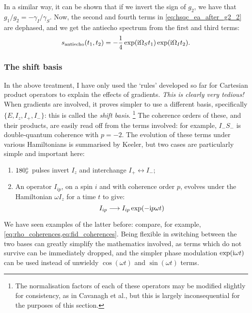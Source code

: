 In a similar way, it can be shown that if we invert the sign of $g_2$, we have that $g_1/g_2 = -\gamma_I/\gamma_S$.
Now, the second and fourth terms in \cref{eq:hsqc_ea_after_g2_2} are dephased, and we get the antiecho spectrum from the first and third terms:
\begin{equation}
    \label{eq:hsqc_ea_antiecho_signal}
    s_\text{antiecho}(t_1, t_2) = -\frac{1}{4}\exp(\mathrm{i} \Omega_S t_1)\exp(\mathrm{i} \Omega_I t_2).
\end{equation}


\subsubsection{The shift basis}

In the above treatment, I have only used the `rules' developed so far for Cartesian product operators to explain the effects of gradients.
\textit{This is clearly very tedious!}
When gradients are involved, it proves simpler to use a different basis, specifically $\{E, I_z, I_+, I_-\}$: this is called the \textit{shift basis}.%
\footnote{The normalisation factors of each of these operators may be modified slightly for consistency, as in Cavanagh et al.\autocite{Cavanagh2007}, but this is largely inconsequential for the purposes of this section.}
The coherence orders of these, and their products, are easily read off from the terms involved: for example, $I_-S_-$ is double-quantum coherence with $p = -2$.
The evolution of these terms under various Hamiltonians is summarised by Keeler\autocite{Keeler2010}, but two cases are particularly simple and important here:
\begin{enumerate}
    \item $\angang{180}{x}$ pulses invert $I_z$ and interchange $I_+ \leftrightarrow I_-$;
    \item An operator $I_{ip}$, on a spin $i$ and with coherence order $p$, evolves under the Hamiltonian $\omega I_z$ for a time $t$ to give:
        \begin{equation}
            \label{eq:shift_operator_evolution}
            I_{ip} \longrightarrow I_{ip} \exp(-\mathrm{i} p\omega t)
        \end{equation}
\end{enumerate}
We have seen examples of the latter before: compare, for example, \cref{eq:rho_coherences,eq:fid_coherences}.
Being flexible in switching between the two bases can greatly simplify the mathematics involved, as terms which do not survive can be immediately dropped, and the simpler phase modulation $\exp(\mathrm{i}\omega t)$ can be used instead of unwieldy $\cos(\omega t)$ and $\sin(\omega t)$ terms.

